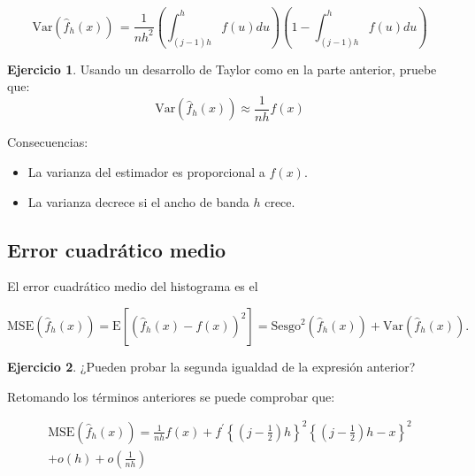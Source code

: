 \documentclass[
  12pt,
]{book}
\providecommand{\tightlist}{%
  \setlength{\itemsep}{0pt}\setlength{\parskip}{0pt}}
\theoremstyle{definition}
\theoremstyle{definition}
\theoremstyle{definition}
\newtheorem{exercise}{Ejercicio}[chapter]
\theoremstyle{definition}
\theoremstyle{remark}
\begin{document}
\begin{equation*}
\mathrm{Var}\left( \hat{f}_h(x)\right)\, =
\frac{1}{nh^2} \left(\int_{(j - 1)h}^{h} f(u)du \right)\left( 1 -\int_{(j - 1)h}^{h} f(u)du \right)
\end{equation*}

\begin{exercise}
\protect\hypertarget{exr:unnamed-chunk-4}{}\label{exr:unnamed-chunk-4}Usando un desarrollo de Taylor como en la parte anterior, pruebe que:
\begin{equation*}
\mathrm{Var}\left( \hat{f}_h(x)\right)\approx
\frac{1}{nh} f(x)
\end{equation*}
\end{exercise}

Consecuencias:

\begin{itemize}
\tightlist
\item
  La varianza del estimador es proporcional a \(f(x)\).
\item
  La varianza decrece si el ancho de banda \(h\) crece.
\end{itemize}

\hypertarget{error-cuadruxe1tico-medio}{%
\subsection{Error cuadrático medio}\label{error-cuadruxe1tico-medio}}

El error cuadrático medio del histograma es el

\begin{equation*}
\mathrm{MSE}\left( \hat{f}_h(x)\right) =
\mathrm{E}\left[\left(\hat{f}_h(x) - f(x)\right)^2\right] = \mathrm{Sesgo}^2\left( \hat{f}_h(x)\right) + \mathrm{Var}\left( \hat{f}_h(x)\right).
\end{equation*}

\begin{exercise}
\protect\hypertarget{exr:unnamed-chunk-5}{}\label{exr:unnamed-chunk-5}¿Pueden probar la segunda igualdad de la expresión anterior?
\end{exercise}

Retomando los términos anteriores se puede comprobar que:

\begin{align} 
\mathrm{MSE}\left( \hat{f}_h(x)\right) = \frac{1}{nh} f(x) +
f^\prime \left\{ \left( j - \frac{1}{2} \right) h \right\}^2 \left\{ \left( j -
\frac{1}{2} \right) h - x \right\}^2 \\
+ o\left(h \right) +        o\left(\frac{1}{nh} \right)
\label{eq:MSE}
\end{align}
\end{document}
